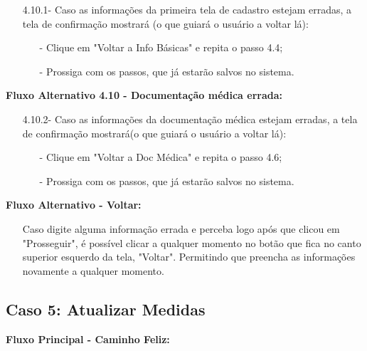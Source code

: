 \documentclass{article}
\begin{document}
    \begin{itemize}
        \item[4.10.1-] Caso as informações da primeira tela de cadastro estejam erradas, a tela de confirmação mostrará (o que guiará o usuário a voltar lá):
        
        \begin{itemize}
            \item[-] Clique em "Voltar a Info Básicas" e repita o passo 4.4;
            \item[-] Prossiga com os passos, que já estarão salvos no sistema.
        \end{itemize}
    \end{itemize}

    \textbf{Fluxo Alternativo 4.10 - Documentação médica errada:}

    \begin{itemize}
        \item[4.10.2-] Caso as informações da documentação médica estejam erradas, a tela de confirmação mostrará(o que guiará o usuário a voltar lá):

        \begin{itemize}
            \item[-] Clique em "Voltar a Doc Médica" e repita o passo 4.6;
            \item[-] Prossiga com os passos, que já estarão salvos no sistema.
        \end{itemize}
    \end{itemize}

    \textbf{Fluxo Alternativo - Voltar:}

    \begin{itemize}
        \item[] Caso digite alguma informação errada e perceba logo após que clicou em "Prosseguir", é possível clicar a qualquer momento no botão que fica no canto superior esquerdo da tela, "Voltar". Permitindo que preencha as informações novamente a qualquer momento.
    \end{itemize}

\subsection{Caso 5: Atualizar Medidas}

    \textbf{Fluxo Principal - Caminho Feliz:}
\end{document}
